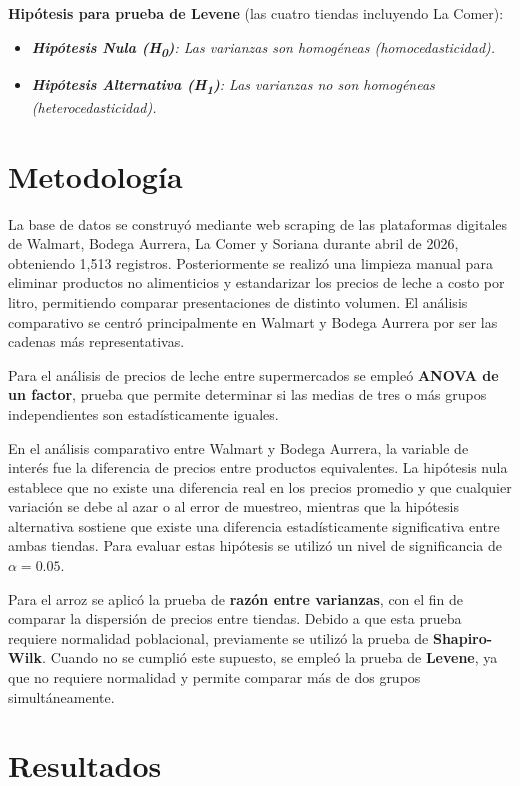 \documentclass[aps, twocolumn, 11pt]{revtex4-2}
\begin{document}
\textbf{Hipótesis para prueba de Levene} (las cuatro tiendas incluyendo La Comer):
\begin{itemize}
	\item \textit{\textbf{Hipótesis Nula (H\textsubscript{0})}: Las varianzas son homogéneas (homocedasticidad).}
	\item \textit{\textbf{Hipótesis Alternativa (H\textsubscript{1})}:  Las varianzas no son homogéneas (heterocedasticidad).}	
\end{itemize}

\section{Metodología}

La base de datos se construyó mediante web scraping de las plataformas digitales de Walmart, Bodega Aurrera, La Comer y Soriana durante abril de 2026, obteniendo 1,513 registros. Posteriormente se realizó una limpieza manual para eliminar productos no alimenticios y estandarizar los precios de leche a costo por litro, permitiendo comparar presentaciones de distinto volumen. El análisis comparativo se centró principalmente en Walmart y Bodega Aurrera por ser las cadenas más representativas.

Para el análisis de precios de leche entre supermercados se empleó \textbf{ANOVA de un factor}, prueba que permite determinar si las medias de tres o más grupos independientes son estadísticamente iguales.

En el análisis comparativo entre Walmart y Bodega Aurrera, la variable de interés fue la diferencia de precios entre productos equivalentes. La hipótesis nula establece que no existe una diferencia real en los precios promedio y que cualquier variación se debe al azar o al error de muestreo, mientras que la hipótesis alternativa sostiene que existe una diferencia estadísticamente significativa entre ambas tiendas. Para evaluar estas hipótesis se utilizó un nivel de significancia de $\alpha = 0.05$.

Para el arroz se aplicó la prueba de \textbf{razón entre varianzas}, con el fin de comparar la dispersión de precios entre tiendas. Debido a que esta prueba requiere normalidad poblacional, previamente se utilizó la prueba de \textbf{Shapiro-Wilk}. Cuando no se cumplió este supuesto, se empleó la prueba de \textbf{Levene}, ya que no requiere normalidad y permite comparar más de dos grupos simultáneamente.

\section{Resultados}
\end{document}
